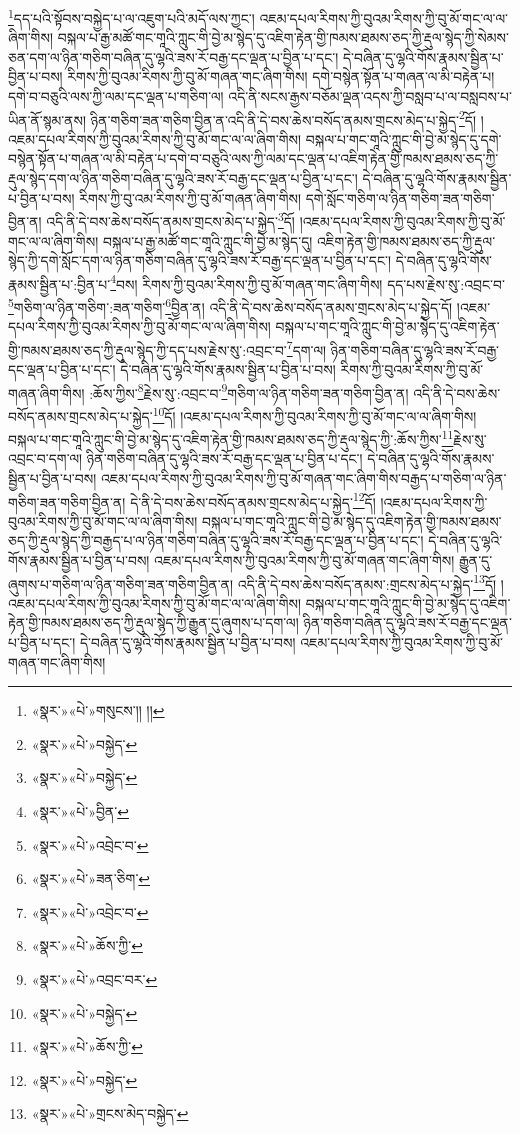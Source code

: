 \footnote{«སྣར་»«པེ་»གསུངས་།། །།}དད་པའི་སྟོབས་བསྐྱེད་པ་ལ་འཇུག་པའི་མདོ་ལས་ཀྱང་། འཇམ་དཔལ་རིགས་ཀྱི་བུའམ་རིགས་ཀྱི་བུ་མོ་གང་ལ་ལ་ཞིག་གིས། བསྐལ་པ་རྒྱ་མཚོ་གང་གཱའི་ཀླུང་གི་བྱེ་མ་སྙེད་དུ་འཇིག་རྟེན་གྱི་ཁམས་ཐམས་ཅད་ཀྱི་རྡུལ་སྙེད་ཀྱི་སེམས་ཅན་དག་ལ་ཉིན་གཅིག་བཞིན་དུ་ལྷའི་ཟས་རོ་བརྒྱ་དང་ལྡན་པ་བྱིན་པ་དང་། དེ་བཞིན་དུ་ལྷའི་གོས་རྣམས་སྦྱིན་པ་བྱིན་པ་བས། རིགས་ཀྱི་བུའམ་རིགས་ཀྱི་བུ་མོ་གཞན་གང་ཞིག་གིས། དགེ་བསྙེན་སྟོན་པ་གཞན་ལ་མི་བརྟེན་པ། དགེ་བ་བཅུའི་ལས་ཀྱི་ལམ་དང་ལྡན་པ་གཅིག་ལ། འདི་ནི་སངས་རྒྱས་བཅོམ་ལྡན་འདས་ཀྱི་བསླབ་པ་ལ་བསླབས་པ་ཡིན་ནོ་སྙམ་ནས། ཉིན་གཅིག་ཟན་གཅིག་བྱིན་ན་འདི་ནི་དེ་བས་ཆེས་བསོད་ནམས་གྲངས་མེད་པ་སྐྱེད་\footnote{«སྣར་»«པེ་»བསྐྱེད་}དོ། །འཇམ་དཔལ་རིགས་ཀྱི་བུའམ་རིགས་ཀྱི་བུ་མོ་གང་ལ་ལ་ཞིག་གིས། བསྐལ་པ་གང་གཱའི་ཀླུང་གི་བྱེ་མ་སྙེད་དུ་དགེ་བསྙེན་སྟོན་པ་གཞན་ལ་མི་བརྟེན་པ་དགེ་བ་བཅུའི་ལས་ཀྱི་ལམ་དང་ལྡན་པ་འཇིག་རྟེན་གྱི་ཁམས་ཐམས་ཅད་ཀྱི་རྡུལ་སྙེད་དག་ལ་ཉིན་གཅིག་བཞིན་དུ་ལྷའི་ཟས་རོ་བརྒྱ་དང་ལྡན་པ་བྱིན་པ་དང་། དེ་བཞིན་དུ་ལྷའི་གོས་རྣམས་སྦྱིན་པ་བྱིན་པ་བས། རིགས་ཀྱི་བུ་འམ་རིགས་ཀྱི་བུ་མོ་གཞན་ཞིག་གིས། དགེ་སློང་གཅིག་ལ་ཉིན་གཅིག་ཟན་གཅིག་བྱིན་ན། འདི་ནི་དེ་བས་ཆེས་བསོད་ནམས་གྲངས་མེད་པ་སྐྱེད་\footnote{«སྣར་»«པེ་»བསྐྱེད་}དོ། །འཇམ་དཔལ་རིགས་ཀྱི་བུའམ་རིགས་ཀྱི་བུ་མོ་གང་ལ་ལ་ཞིག་གིས། བསྐལ་པ་རྒྱ་མཚོ་གང་གཱའི་ཀླུང་གི་བྱེ་མ་སྙེད་དུ། འཇིག་རྟེན་གྱི་ཁམས་ཐམས་ཅད་ཀྱི་རྡུལ་སྙེད་ཀྱི་དགེ་སློང་དག་ལ་ཉིན་གཅིག་བཞིན་དུ་ལྷའི་ཟས་རོ་བརྒྱ་དང་ལྡན་པ་བྱིན་པ་དང་། དེ་བཞིན་དུ་ལྷའི་གོས་རྣམས་སྦྱིན་པ་:བྱིན་པ་\footnote{«སྣར་»«པེ་»བྱིན་}བས། རིགས་ཀྱི་བུའམ་རིགས་ཀྱི་བུ་མོ་གཞན་གང་ཞིག་གིས། དད་པས་རྗེས་སུ་:འབྲང་བ་\footnote{«སྣར་»«པེ་»འབྲེང་བ་}གཅིག་ལ་ཉིན་གཅིག་:ཟན་གཅིག་\footnote{«སྣར་»«པེ་»ཟན་ཅིག་}བྱིན་ན། འདི་ནི་དེ་བས་ཆེས་བསོད་ནམས་གྲངས་མེད་པ་སྐྱེད་དོ། །འཇམ་དཔལ་རིགས་ཀྱི་བུའམ་རིགས་ཀྱི་བུ་མོ་གང་ལ་ལ་ཞིག་གིས། བསྐལ་པ་གང་གཱའི་ཀླུང་གི་བྱེ་མ་སྙེད་དུ་འཇིག་རྟེན་གྱི་ཁམས་ཐམས་ཅད་ཀྱི་རྡུལ་སྙེད་ཀྱི་དད་པས་རྗེས་སུ་:འབྲང་བ་\footnote{«སྣར་»«པེ་»འབྲེང་བ་}དག་ལ། ཉིན་གཅིག་བཞིན་དུ་ལྷའི་ཟས་རོ་བརྒྱ་དང་ལྡན་པ་བྱིན་པ་དང་། དེ་བཞིན་དུ་ལྷའི་གོས་རྣམས་སྦྱིན་པ་བྱིན་པ་བས། རིགས་ཀྱི་བུའམ་རིགས་ཀྱི་བུ་མོ་གཞན་ཞིག་གིས། :ཆོས་ཀྱིས་\footnote{«སྣར་»«པེ་»ཆོས་ཀྱི་}རྗེས་སུ་:འབྲང་བ་\footnote{«སྣར་»«པེ་»འབྲང་བར་}གཅིག་ལ་ཉིན་གཅིག་ཟན་གཅིག་བྱིན་ན། འདི་ནི་དེ་བས་ཆེས་བསོད་ནམས་གྲངས་མེད་པ་སྐྱེད་\footnote{«སྣར་»«པེ་»བསྐྱེད་}དོ། །འཇམ་དཔལ་རིགས་ཀྱི་བུའམ་རིགས་ཀྱི་བུ་མོ་གང་ལ་ལ་ཞིག་གིས། བསྐལ་པ་གང་གཱའི་ཀླུང་གི་བྱེ་མ་སྙེད་དུ་འཇིག་རྟེན་གྱི་ཁམས་ཐམས་ཅད་ཀྱི་རྡུལ་སྙེད་ཀྱི་:ཆོས་ཀྱིས་\footnote{«སྣར་»«པེ་»ཆོས་ཀྱི་}རྗེས་སུ་འབྲང་བ་དག་ལ། ཉིན་གཅིག་བཞིན་དུ་ལྷའི་ཟས་རོ་བརྒྱ་དང་ལྡན་པ་བྱིན་པ་དང་། དེ་བཞིན་དུ་ལྷའི་གོས་རྣམས་སྦྱིན་པ་བྱིན་པ་བས། འཇམ་དཔལ་རིགས་ཀྱི་བུའམ་རིགས་ཀྱི་བུ་མོ་གཞན་གང་ཞིག་གིས་བརྒྱད་པ་གཅིག་ལ་ཉིན་གཅིག་ཟན་གཅིག་བྱིན་ན། དེ་ནི་དེ་བས་ཆེས་བསོད་ནམས་གྲངས་མེད་པ་སྐྱེད་\footnote{«སྣར་»«པེ་»བསྐྱེད་}དོ། །འཇམ་དཔལ་རིགས་ཀྱི་བུའམ་རིགས་ཀྱི་བུ་མོ་གང་ལ་ལ་ཞིག་གིས། བསྐལ་པ་གང་གཱའི་ཀླུང་གི་བྱེ་མ་སྙེད་དུ་འཇིག་རྟེན་གྱི་ཁམས་ཐམས་ཅད་ཀྱི་རྡུལ་སྙེད་ཀྱི་བརྒྱད་པ་ལ་ཉིན་གཅིག་བཞིན་དུ་ལྷའི་ཟས་རོ་བརྒྱ་དང་ལྡན་པ་བྱིན་པ་དང་། དེ་བཞིན་དུ་ལྷའི་གོས་རྣམས་སྦྱིན་པ་བྱིན་པ་བས། འཇམ་དཔལ་རིགས་ཀྱི་བུའམ་རིགས་ཀྱི་བུ་མོ་གཞན་གང་ཞིག་གིས། རྒྱུན་དུ་ཞུགས་པ་གཅིག་ལ་ཉིན་གཅིག་ཟན་གཅིག་བྱིན་ན། འདི་ནི་དེ་བས་ཆེས་བསོད་ནམས་:གྲངས་མེད་པ་སྐྱེད་\footnote{«སྣར་»«པེ་»གྲངས་མེད་བསྐྱེད་}དོ། །འཇམ་དཔལ་རིགས་ཀྱི་བུའམ་རིགས་ཀྱི་བུ་མོ་གང་ལ་ལ་ཞིག་གིས། བསྐལ་པ་གང་གཱའི་ཀླུང་གི་བྱེ་མ་སྙེད་དུ་འཇིག་རྟེན་གྱི་ཁམས་ཐམས་ཅད་ཀྱི་རྡུལ་སྙེད་ཀྱི་རྒྱུན་དུ་ཞུགས་པ་དག་ལ། ཉིན་གཅིག་བཞིན་དུ་ལྷའི་ཟས་རོ་བརྒྱ་དང་ལྡན་པ་བྱིན་པ་དང་། དེ་བཞིན་དུ་ལྷའི་གོས་རྣམས་སྦྱིན་པ་བྱིན་པ་བས། འཇམ་དཔལ་རིགས་ཀྱི་བུའམ་རིགས་ཀྱི་བུ་མོ་གཞན་གང་ཞིག་གིས། 